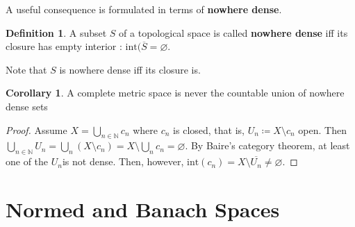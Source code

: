 \documentclass[10pt,a4paper]{article}
\theoremstyle{definition}
\newtheorem{definition}{Definition}
\theoremstyle{cor}
\newtheorem{cor}{Corollary}
\theoremstyle{theorem}
\theoremstyle{lemma}
\theoremstyle{example}
\begin{document}
A useful consequence is formulated in terms of \textbf{nowhere dense}.
\begin{definition}
A subset $S$ of a topological space is called \textbf{nowhere dense} iff its closure has empty interior : $\text{int}(\overline{S} = \varnothing$.
\end{definition}
Note that $S$ is nowhere dense iff its closure is. 

\begin{cor}
A complete metric space is never the countable union of nowhere dense sets
\end{cor}
\begin{proof}
Assume $X = \bigcup_{n\in\mathbb{N}} c_n$ where $c_n$ is closed, that is, $U_n \coloneqq X \setminus c_n$ open. Then $\bigcup_{n\in\mathbb{N}} U_n = \bigcup_{n}(X\setminus c_n) = X \setminus \bigcup_{n} c_n = \varnothing$. By Baire's category theorem, at least one of the $U_n$is not dense. Then, however, $\text{int}(c_n) = X \setminus \overline{U_n} \neq \varnothing$.
\end{proof}

\section{Normed and Banach Spaces}
\end{document}
